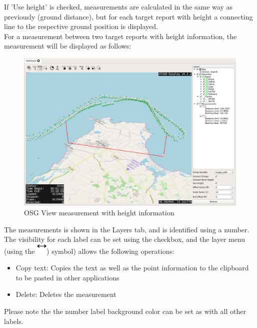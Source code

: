 {If 'Use height' is checked, measurements are calculated in the same way as previously (ground distance), but for each target report with height a connecting line to the respective ground position is displayed. \\

For a measurement between two target reports with height information, the measurement will be displayed as follows:

\begin{figure}[H]
    \hspace*{-2cm}
    \includegraphics[width=18cm,frame]{../screenshots/osgview_measure3d.png}
  \caption{OSG View measurement with height information}
\end{figure}

The measurements is shown in the Layers tab, and is identified using a number. The visibility for each label can be set using the checkbox, and the layer menu (using the \includegraphics[width=0.5cm]{../../data/icons/measure.png}) symbol) allows the following operations:

\begin{itemize}
 \item Copy text: Copies the text as well as the point information to the clipboard to be pasted in other applications
 \item Delete: Deletes the measurement
\end{itemize}

Please note the the number label background color can be set as with all other labels. 

}
